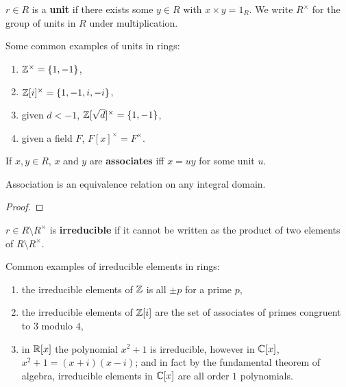 \documentclass[../Year2.tex]{subfiles}
\begin{document}
\begin{definition}[Unit]
    $r\in R$ is a \textbf{unit} if there exists some $y\in R$ with $x\times y=1_R$. We write  $R^\times$ for the group of units in $R$ under multiplication.
\end{definition}

\begin{examples}
    Some common examples of units in rings: \begin{enumerate}
        \item $\mathbb{Z}^\times = \{1,-1\}$,
        \item $\mathbb{Z}[i]^\times=\{1,-1,i,-i\}$,
        \item given $d<-1$, $\mathbb{Z}[\sqrt{d}]^\times=\{1,-1\}$,
        \item given a field $F$, $F[x]^\times=F^\times$.
    \end{enumerate}
\end{examples}

\begin{definition}[Associates]
    If $x,y\in R$, $x$ and $y$ are \textbf{associates} iff $x=uy$ for some unit $u$.
\end{definition}

\begin{proposition}
    Association is an equivalence relation on any integral domain.
    \begin{proof}
        
    \end{proof}
\end{proposition}

\begin{definition}[Irreducible]
    $r\in R\setminus R^\times$ is \textbf{irreducible} if it cannot be written as the product of two elements of $R\setminus R^\times$.
\end{definition}

\begin{examples}
    Common examples of irreducible elements in rings: \begin{enumerate}
        \item the irreducible elements of $\mathbb{Z}$ is all $\pm p$ for a prime $p$,
        \item the irreducible elements of $\mathbb{Z}[i]$ are the set of associates of primes congruent to $3$ modulo $4$,
        \item in $\mathbb{R}[x]$ the polynomial $x^2+1$ is irreducible, however in $\mathbb{C}[x]$, $x^2+1=(x+i)(x-i)$; and in fact by the fundamental theorem of algebra, irreducible elements in $\mathbb{C}[x]$ are all order $1$ polynomials.
    \end{enumerate}
\end{examples}
\end{document}
